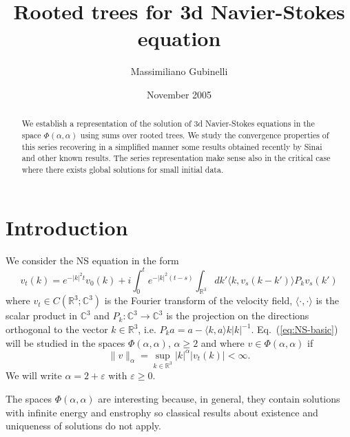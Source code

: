 \documentclass[a4paper,12pt,reqno]{amsart}
\newcommand{\1}{{\bf 1}}
\newcommand{\eps}{\varepsilon}
\newcommand{\RR}{\mathbb{R}}
\newcommand{\CC}{\mathbb{C}}
\begin{document}
\title{Rooted trees for  3d Navier-Stokes equation}
\author{Massimiliano Gubinelli}
\address{Dip. di Matematica Applicata ``U. Dini'' -- Universit\`a di
Pisa, Italia}
\date{November 2005}
\maketitle


\begin{abstract}
We establish a representation of the solution of 3d Navier-Stokes equations in the space $\Phi(\alpha,\alpha)$ using sums over rooted trees.
We study the convergence properties of this series recovering in a simplified manner some results obtained recently by Sinai and other known results. The series representation make sense also in the critical case where there exists global solutions for small initial data. 
\end{abstract}

\section{Introduction}

We consider the NS equation in the form
\begin{equation}
  \label{eq:NS-basic}
v_t(k) = e^{-|k|^2 t} v_0(k) + i \int_0^t e^{-|k|^2 (t-s)} \int_{\RR^3}dk' \langle k, v_s(k-k')\rangle P_k v_s(k') 
\end{equation}
where $v_t \in C(\RR^3 ; \mathbb{C}^3)$ is the Fourier transform of
the velocity field, $\langle \cdot ,\cdot \rangle$ is the scalar
product in $\mathbb{C}^3$ and $P_k: \CC^3 \to \CC^3$ is the projection
on the directions orthogonal to the vector $k \in \RR^3$, i.e.
$
P_k a = a - \langle k,a\rangle k |k|^{-1}
$.
Eq.~(\ref{eq:NS-basic}) will be studied in the spaces
$\Phi(\alpha,\alpha)$, $\alpha \ge 2$ and where $v \in \Phi(\alpha,\alpha)$ if
$$\|v\|_\alpha = \sup_{k\in\RR^3} |k|^\alpha |v_t(k)| < \infty. $$
We will write $\alpha = 2+\eps$ with $\eps \ge 0$.

The spaces $\Phi(\alpha,\alpha)$ are interesting because, in general,
they contain solutions with infinite energy and enstrophy so classical
results about existence and uniqueness of solutions
do not apply.
\end{document}
